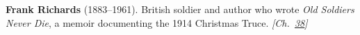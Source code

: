 \textbf{Frank Richards} (1883–1961). British soldier and author who wrote \emph{Old Soldiers Never Die}, a memoir documenting the 1914 Christmas Truce. \emph{[Ch.~\hyperref[ch:christmastruce1914]{38}]}

